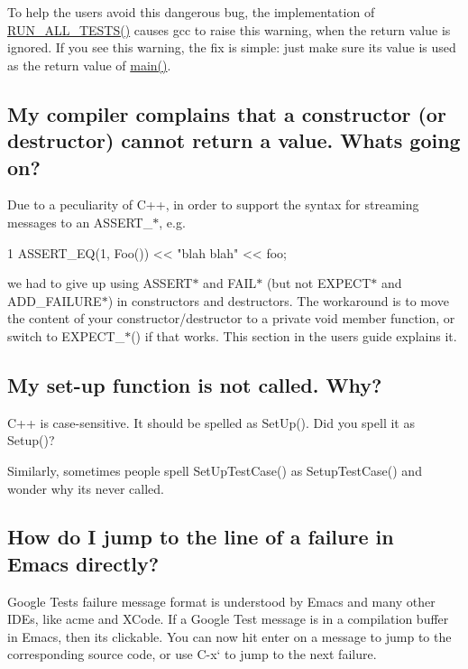 To help the users avoid this dangerous bug, the implementation of {\ttfamily \hyperlink{gtest_8h_a853a3792807489591d3d4a2f2ff9359f}{R\+U\+N\+\_\+\+A\+L\+L\+\_\+\+T\+E\+S\+T\+S()}} causes gcc to raise this warning, when the return value is ignored. If you see this warning, the fix is simple\+: just make sure its value is used as the return value of {\ttfamily \hyperlink{app_2main_8cpp_ae66f6b31b5ad750f1fe042a706a4e3d4}{main()}}.

\subsection*{My compiler complains that a constructor (or destructor) cannot return a value. What\textquotesingle{}s going on?}

Due to a peculiarity of C++, in order to support the syntax for streaming messages to an {\ttfamily A\+S\+S\+E\+R\+T\+\_\+$\ast$}, e.\+g.


\begin{DoxyCode}
1 ASSERT\_EQ(1, Foo()) << "blah blah" << foo;
\end{DoxyCode}


we had to give up using {\ttfamily A\+S\+S\+E\+R\+T$\ast$} and {\ttfamily F\+A\+I\+L$\ast$} (but not {\ttfamily E\+X\+P\+E\+C\+T$\ast$} and {\ttfamily A\+D\+D\+\_\+\+F\+A\+I\+L\+U\+R\+E$\ast$}) in constructors and destructors. The workaround is to move the content of your constructor/destructor to a private void member function, or switch to {\ttfamily E\+X\+P\+E\+C\+T\+\_\+$\ast$()} if that works. This section in the user\textquotesingle{}s guide explains it.

\subsection*{My set-\/up function is not called. Why?}

C++ is case-\/sensitive. It should be spelled as {\ttfamily Set\+Up()}. Did you spell it as {\ttfamily Setup()}?

Similarly, sometimes people spell {\ttfamily Set\+Up\+Test\+Case()} as {\ttfamily Setup\+Test\+Case()} and wonder why it\textquotesingle{}s never called.

\subsection*{How do I jump to the line of a failure in Emacs directly?}

Google Test\textquotesingle{}s failure message format is understood by Emacs and many other I\+D\+Es, like acme and X\+Code. If a Google Test message is in a compilation buffer in Emacs, then it\textquotesingle{}s clickable. You can now hit {\ttfamily enter} on a message to jump to the corresponding source code, or use {\ttfamily C-\/x}` to jump to the next failure.

